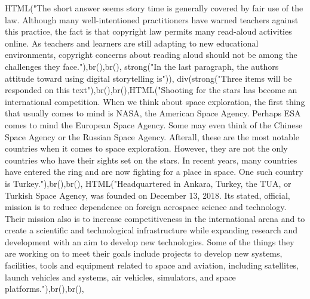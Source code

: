 \documentclass[
]{article}
\newenvironment{Shaded}{\begin{snugshade}}{\end{snugshade}}
\newcommand{\FunctionTok}[1]{\textcolor[rgb]{0.00,0.00,0.00}{#1}}
\newcommand{\NormalTok}[1]{#1}
\newcommand{\StringTok}[1]{\textcolor[rgb]{0.31,0.60,0.02}{#1}}
\begin{document}
\begin{Shaded}
\begin{Highlighting}[]
               \FunctionTok{HTML}\NormalTok{(}\StringTok{"The short answer seems story time is generally covered by fair use of the law. Although many well{-}intentioned practitioners have warned teachers against this practice, the fact is that copyright law permits many read{-}aloud activities online. As teachers and learners are still adapting to new educational environments, copyright concerns about reading aloud should not be among the challenges they face."}\NormalTok{),}\FunctionTok{br}\NormalTok{(),}\FunctionTok{br}\NormalTok{(),}
               \FunctionTok{strong}\NormalTok{(}\StringTok{"In the last paragraph, the authors attitude toward using digital storytelling is"}\NormalTok{)),}
           \FunctionTok{div}\NormalTok{(}\FunctionTok{strong}\NormalTok{(}\StringTok{"Three items will be responded on this text"}\NormalTok{),}\FunctionTok{br}\NormalTok{(),}\FunctionTok{br}\NormalTok{(),}\FunctionTok{HTML}\NormalTok{(}\StringTok{"Shooting for the stars has become an international competition. When we think about space exploration, the first thing that usually comes to mind is NASA, the American Space Agency. Perhaps ESA comes to mind  the European Space Agency. Some may even think of the Chinese Space Agency or the Russian Space Agency. Afterall, these are the most notable countries when it comes to space exploration. However, they are not the only countries who have their sights set on the stars. In recent years, many countries have entered the ring and are now fighting for a place in space. One such country is Turkey."}\NormalTok{),}\FunctionTok{br}\NormalTok{(),}\FunctionTok{br}\NormalTok{(), }
               \FunctionTok{HTML}\NormalTok{(}\StringTok{"Headquartered in Ankara, Turkey, the TUA, or Turkish Space Agency, was founded on December 13, 2018. Its stated, official, mission is to reduce dependence on foreign aerospace science and technology. Their mission also is to increase competitiveness in the international arena and to create a scientific and technological infrastructure while expanding research and development with an aim to develop new technologies. Some of the things they are working on to meet their goals include projects to develop new systems, facilities, tools and equipment related to space and aviation, including satellites, launch vehicles and systems, air vehicles, simulators, and space platforms."}\NormalTok{),}\FunctionTok{br}\NormalTok{(),}\FunctionTok{br}\NormalTok{(),}

\end{Highlighting}
\end{Shaded}
\end{document}
